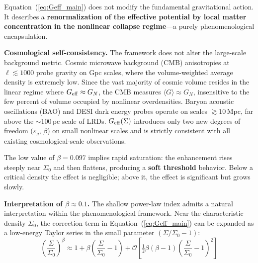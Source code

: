 \documentclass[apj,twocolumn,longbibliography,linenumbers]{aastex701}
\begin{document}
\begin{table}[h]
\caption{Parameters of the $G_{\rm eff}(\Sigma)$ Relation}
\label{tab:geff_params}
\centering
\small
{}
\end{table}

Equation~(\ref{eq:Geff_main}) does not modify the fundamental gravitational action. It describes a \textbf{renormalization of the effective potential by local matter concentration in the nonlinear collapse regime}---a purely phenomenological encapsulation.

\textbf{Cosmological self-consistency.} The framework does not alter the large-scale background metric. Cosmic microwave background (CMB) anisotropies at $\ell \lesssim 1000$ probe gravity on Gpc scales, where the volume-weighted average density is extremely low. Since the vast majority of cosmic volume resides in the linear regime where $G_{\rm eff} \approx G_N$, the CMB measures $\langle G \rangle \approx G_N$, insensitive to the few percent of volume occupied by nonlinear overdensities. Baryon acoustic oscillations (BAO) and DESI dark energy probes operate on scales $\gtrsim 10$\,Mpc, far above the ${\sim}100$\,pc scale of LRDs. $G_{\rm eff}(\Sigma)$ introduces only two new degrees of freedom ($\varepsilon_g$, $\beta$) on small nonlinear scales and is strictly consistent with all existing cosmological-scale observations.

The low value of $\beta = 0.097$ implies rapid saturation: the enhancement rises steeply near $\Sigma_0$ and then flattens, producing a \textbf{soft threshold} behavior. Below a critical density the effect is negligible; above it, the effect is significant but grows slowly.

\textbf{Interpretation of $\beta \approx 0.1$.} The shallow power-law index admits a natural interpretation within the phenomenological framework. Near the characteristic density $\Sigma_0$, the correction term in Equation~(\ref{eq:Geff_main}) can be expanded as a low-energy Taylor series in the small parameter $(\Sigma/\Sigma_0 - 1)$:
\begin{equation}
\left(\frac{\Sigma}{\Sigma_0}\right)^{\!\beta} \approx 1 + \beta\left(\frac{\Sigma}{\Sigma_0} - 1\right) + \mathcal{O}\!\left[\tfrac{1}{2}\beta(\beta{-}1)\left(\frac{\Sigma}{\Sigma_0} - 1\right)^{\!2}\right]
\end{equation}
\end{document}
